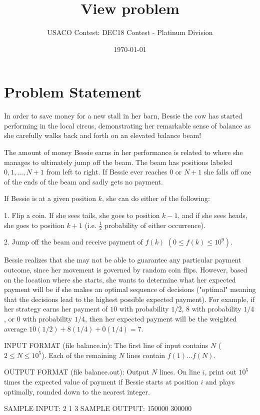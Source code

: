 \documentclass[12pt]{article}
\title{View problem}
\author{USACO Contest: DEC18 Contest - Platinum Division}
\date{\today}
\begin{document}
\maketitle

\section*{Problem Statement}

In order to save money for a new stall in her barn, Bessie the cow 
has started performing in the local circus, demonstrating her remarkable
sense of balance as she carefully walks back and forth on an elevated
balance beam!  

The amount of money Bessie earns in her performance is
related to where she manages to ultimately jump off the beam.  
The beam has positions labeled $0, 1, \ldots, N+1$ from left to right.  
If Bessie ever reaches $0$ or $N+1$ she falls off one of the ends
of the beam and sadly gets no payment.  

If Bessie is at a given position $k$, she can do either of the following: 

1. Flip a coin.  If she sees tails, she goes to position $k-1$, and if she
sees heads, she goes to position $k + 1$ (i.e. $\frac{1}{2}$ probability of either occurrence).

2. Jump off the beam and receive payment of $f(k)$ $(0 \leq f(k) \leq 10^9)$.

Bessie realizes that she may not be able to guarantee any particular 
payment outcome, since her movement is governed by random coin flips. 
However, based on the location where she starts, she wants to determine what her 
expected payment will be if she makes an optimal sequence of decisions ("optimal"
meaning that the decisions lead to the highest possible expected payment).
For example, if her strategy earns her payment of $10$ with probability $1/2$, 
$8$ with probability $1/4$, or $0$ with probability $1/4$, then her expected 
payment will be the weighted average $10(1/2) + 8(1/4) + 0(1/4) = 7$.

INPUT FORMAT (file balance.in):
The first line of input contains $N$ ($2 \leq N \leq 10^5$).  Each of the
remaining $N$ lines contain $f(1) \ldots f(N)$.

OUTPUT FORMAT (file balance.out):
Output $N$ lines.  On line $i$, print out $10^5$ times the expected value of
payment if Bessie starts at position $i$ and plays optimally, rounded down to
the nearest integer.

SAMPLE INPUT:
2
1
3
SAMPLE OUTPUT: 
150000
300000
\end{document}
